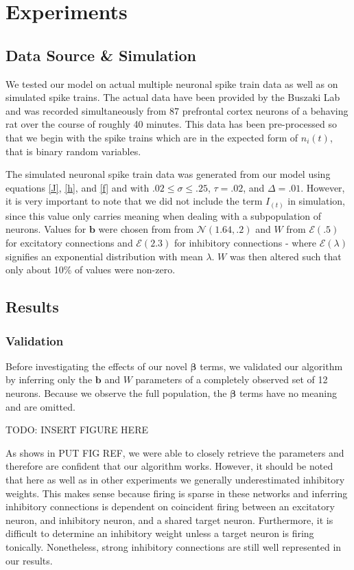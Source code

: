 \documentclass{article}
\begin{document}
\section{Experiments}

\subsection{Data Source \& Simulation}

We tested our model on actual multiple neuronal spike train data as well as on simulated spike trains. The actual data have been provided by the Buszaki Lab and was recorded simultaneously from 87 prefrontal cortex neurons of a behaving rat over the course of roughly 40 minutes. This data has been pre-processed so that we begin with the spike trains which are in the expected form of $n_i(t)$, that is binary random variables. 

The simulated neuronal spike train data was generated from our model using equations \eqref{J}, \eqref{h}, and \eqref{f} and with $.02 \leq \sigma \leq .25$, $\tau = .02$, and $\Delta = .01$. However, it is very important to note that we did not include the term $I_(t)$ in simulation, since this value only carries meaning when dealing with a subpopulation of neurons. Values for $\mathbf{b}$ were chosen from from $\mathcal{N}(1.64,.2)$ and $W$ from $\mathcal{E}(.5)$ for excitatory connections and $\mathcal{E}(2.3)$ for inhibitory connections - where $\mathcal{E}(\lambda)$ signifies an exponential distribution with mean $\lambda$. $W$ was then altered such that only about 10\% of values were non-zero.

\subsection{Results}

\subsubsection{Validation}

Before investigating the effects of our novel $\bm{\beta}$ terms, we validated our algorithm by inferring only the $\mathbf{b}$ and $W$ parameters of a completely observed set of 12 neurons. Because we observe the full population, the $\bm{\beta}$ terms have no meaning and are omitted.

TODO: INSERT FIGURE HERE

As shows in PUT FIG REF, we were able to closely retrieve the parameters and therefore are confident that our algorithm works. However, it should be noted that here as well as in other experiments we generally underestimated inhibitory weights. This makes sense because firing is sparse in these networks and inferring inhibitory connections is dependent on coincident firing between an excitatory neuron, and inhibitory neuron, and a shared target neuron. Furthermore, it is difficult to determine an inhibitory weight unless a target neuron is firing tonically. Nonetheless, strong inhibitory connections are still well represented in our results.
\end{document}
